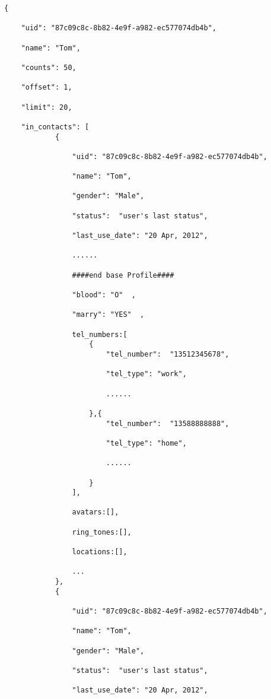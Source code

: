 \begin{verbatim}
{

    "uid": "87c09c8c-8b82-4e9f-a982-ec577074db4b",

    "name": "Tom",  

    "counts": 50,  

    "offset": 1,  

    "limit": 20,  

    "in_contacts": [
            {

                "uid": "87c09c8c-8b82-4e9f-a982-ec577074db4b",

                "name": "Tom",

                "gender": "Male",

                "status":  "user's last status",

                "last_use_date": "20 Apr, 2012",

                ......

                ####end base Profile####

                "blood": "O"  ,

                "marry": "YES"  ,

                tel_numbers:[
                    {
                        "tel_number":  "13512345678",

                        "tel_type": "work",

                        ......

                    },{
                        "tel_number":  "13588888888",

                        "tel_type": "home",

                        ......

                    }
                ],

                avatars:[],

                ring_tones:[],

                locations:[],

                ...
            },
            {

                "uid": "87c09c8c-8b82-4e9f-a982-ec577074db4b",

                "name": "Tom",

                "gender": "Male",

                "status":  "user's last status",

                "last_use_date": "20 Apr, 2012",


\end{verbatim}
